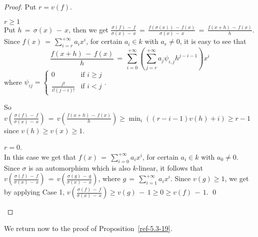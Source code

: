 \documentclass{amsart}
\numberwithin{equation}{section}
\theoremstyle{definition}
\theoremstyle{remark}
\begin{document}
\begin{proof}
    Put $r=v(f)$.
\begin{case} $r \geq 1$
    \\ Put $h \,=\, \sigma(x) \,-\, x$, then we get 
    $\displaystyle{\frac{\sigma(f) \,-\, f}{\sigma(x) \,-\, x} \,=\, 
    \frac{f(\sigma(x)) \,-\, f(x)}{\sigma(x) \,-\, x} \,=\, 
    \frac{f(x+h) \,-\, f(x)}{h}}$. Since $f(x) \,=\, 
    \displaystyle{\sum_{i=r}^{+\infty} a_{i}x^{i}}$, for certain 
    $a_{i} \in k$ with $a_{r} \neq 0$, it is easy to see that 
    \[\frac{f(x+h) \,-\, f(x)}{h} \,=\, \sum_{i=0}^{+\infty} \left( 
    \sum_{j=r}^{+\infty} a_{j} \psi_{i,j} h^{j-i-1} \right) x^{i} \]
    where 
$\psi_{ij}=\begin{cases} 0&\text{if $i\ge j$}\\
\frac{j!}{i!(j-i)!} &\text{if $i<j$}
\end{cases} 
$.
    
So $\displaystyle{v \left( \frac{\sigma(f) \,-\, f}{\sigma(x) 
    \,-\, x} \right) \,=\, v \left( \frac{f(x+h) \,-\, 
    f(x)}{h}\right)}\ge \min_i((r-i-1)v(h)+i)\ge r-1$
    since $v(h) \ge v(x)\ge 1$.
\end{case}
\begin{case} $r=0$.
    \\ In this case we get that $f(x) \,=\, 
    \displaystyle{\sum_{i=0}^{+\infty} a_{i}x^{i}}$, for certain 
    $a_{i} \in k$ with $a_{0} \neq 0$.
     Since $\sigma$ is an automorphism which is also $k$-linear, it 
    follows that $\displaystyle{v \left( \frac{\sigma(f) \,-\, 
    f}{\sigma(x) \,-\, x} \right) \,=\, v \left( \frac{\sigma(g) \,-\, 
    g}{\sigma(x) \,-\, x} \right)}$, where $g \,=\, 
    \displaystyle{\sum_{i=1}^{+\infty} a_{i}x^{i}}$. Since $v(g) \geq 
    1$, we get by applying Case 1, $\displaystyle{v \left( \frac{\sigma(f) \,-\, 
    f}{\sigma(x) \,-\, x} \right)} \geq v(g) \,-\, 1 \geq 0 \geq v(f) 
    \,-\, 1$. \qed
\end{case}
\def\qed{}\end{proof}
We return now to the proof of Proposition~\ref{ref-5.3-19}.
\end{document}
